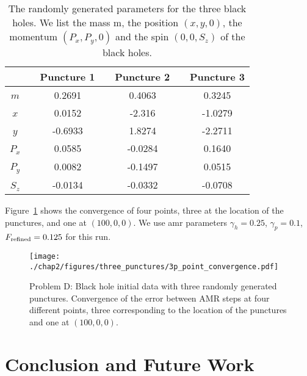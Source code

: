 \begin{table}
\centering
\begin{tabular}{cccc}
\hline
 \,\,\,\, & Puncture 1  \,\,\,\, & Puncture 2  \,\,\,\, & Puncture 3 \\ \hline
  $m$ \,\,\,\, &0.2691  \,\,\,\, & 0.4063  \,\,\,\, & 0.3245  \\
  $x$ \,\,\,\, &0.0152  \,\,\,\, & -2.316  \,\,\,\, & -1.0279  \\
  $y$ \,\,\,\, &-0.6933  \,\,\,\, & 1.8274  \,\,\,\, &  -2.2711  \\ 
  $P_x$ \,\,\,\, &0.0585  \,\,\,\, & -0.0284  \,\,\,\, &  0.1640 \\
  $P_y$ \,\,\,\, &0.0082  \,\,\,\, &  -0.1497 \,\,\,\, &  0.0515 \\
  $S_z$ \,\,\,\, &-0.0134  \,\,\,\, &  -0.0332  \,\,\,\, & -0.0708 \\ \hline
\end{tabular}
\caption{
  The randomly generated parameters for the three black holes.  We list the mass m, the position $(x,y,0)$, the momentum $(P_x, P_y, 0)$ and the spin $(0,0,S_z)$ of the black holes.
}
\label{tab:Multi_Punctures}
\end{table}

Figure~\ref{fig:three_punctures_convergence} shows the convergence of four points, three at the location of the punctures, and one at $(100,0,0)$. We use amr parameters $\gamma_h=0.25$, $\gamma_p=0.1$, $F_{\rm refined}=0.125$ for this run.

\begin{figure}[H]
  \centering
  \texttt{[image: ./chap2/figures/three\_punctures/3p\_point\_convergence.pdf]}
  \caption{Problem D: Black hole initial data with three randomly generated punctures.  Convergence of the error between AMR steps at four different points, three corresponding to the location of the punctures and one at $(100,0,0)$.
  }
  \label{fig:three_punctures_convergence} 
\end{figure}

%
\section{Conclusion and Future Work}
\label{sec:Conclusions}


